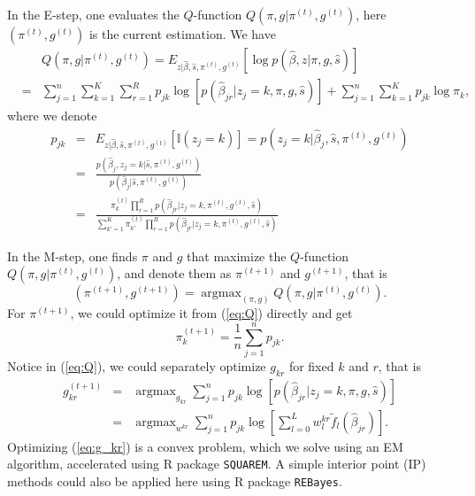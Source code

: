 \documentclass[12pt]{article}
\DeclareMathOperator*{\argmax}{argmax}
\begin{document}
\vspace{4mm}\noindent In the E-step, one evaluates the $Q$-function $Q(\pi,g|\pi^{(t)},g^{(t)})$, here $(\pi^{(t)},g^{(t)})$ is the current estimation. We have
\begin{eqnarray}
    &&Q(\pi,g|\pi^{(t)},g^{(t)}) = E_{z|\hat\beta,\hat s,\pi^{(t)},g^{(t)}}\left[\log p(\hat\beta,z|\pi,g,\hat s)\right]\nonumber\\
    &=&\sum_{j=1}^n\sum_{k=1}^K\sum_{r=1}^Rp_{jk}\log \left[p(\hat\beta_{jr}|z_j=k,\pi,g,\hat s)\right]+\sum_{j=1}^n\sum_{k=1}^Kp_{jk}\log\pi_k,
\label{eq:Q}
\end{eqnarray}
where we denote
\begin{eqnarray}
    p_{jk}&=&E_{z|\hat\beta,\hat s,\pi^{(t)},g^{(t)}}[\mathbb{I}(z_j=k)]=p(z_j=k|\hat\beta_j,\hat s,\pi^{(t)},g^{(t)})\nonumber\\
    &=& \frac{p(\hat\beta_j,z_j=k|\hat s,\pi^{(t)},g^{(t)})}{p(\hat\beta_j|\hat s,\pi^{(t)},g^{(t)})}\nonumber\\
    &=& \frac{\pi_k^{(t)}\prod_{r=1}^Rp(\hat\beta_{jr}|z_j=k,\pi^{(t)},g^{(t)},\hat s)}{\sum_{k'=1}^K\pi_{k'}^{(t)}\prod_{r=1}^Rp(\hat\beta_{jr}|z_j=k,\pi^{(t)},g^{(t)},\hat s)}
\end{eqnarray}


\vspace{4mm}\noindent In the M-step, one finds $\pi$ and $g$ that maximize the $Q$-function $Q(\pi,g|\pi^{(t)},g^{(t)})$, and denote them as $\pi^{(t+1)}$ and $g^{(t+1)}$, that is 
\begin{equation}
(\pi^{(t+1)}, g^ {(t+1)}) =\argmax_{(\pi,g)} Q(\pi,g|\pi^{(t)},g^{(t)}).
\end{equation}
For $\pi^{(t+1)}$, we could optimize it from (\ref{eq:Q}) directly and get
\begin{equation}
    \pi_k^{(t+1)} = \frac{1}{n} \sum_{j=1}^n p_{jk}.
\end{equation}
Notice in (\ref{eq:Q}), we could separately optimize $g_{kr}$ for fixed $k$ and $r$, that is 
\begin{eqnarray}
    g_{kr}^ {(t+1)}&=&\argmax_{g_{kr}}\sum_{j=1}^np_{jk}\log \left[p(\hat\beta_{jr}|z_j=k,\pi,g,\hat s) \right] \nonumber \\
 &=&\argmax_{w^{kr}}\sum_{j=1}^np_{jk}\log\left[\sum_{l=0}^L w_l^{kr}\tilde f_l(\hat\beta_{jr}) \right].
\label{eq:g_kr}
\end{eqnarray}
Optimizing (\ref{eq:g_kr}) is a convex problem, which we solve using an EM algorithm, accelerated using R package {\tt SQUAREM}. A simple interior point (IP) methods could also be applied here using R package {\tt REBayes}. 
\end{document}
